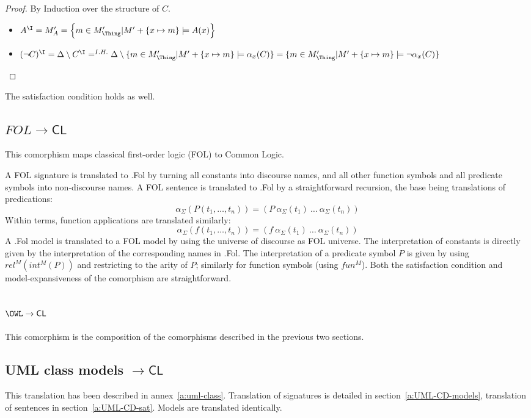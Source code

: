 \documentclass[10pt,fleqn,final]{scrreprt}
\newcommand*{\CL}{\ensuremath{\mathsf{CL}}\xspace}
\newcommand{\ssclause}[1]{\subsection{#1}}
\newenvironment{definitions}[0]{\medskip }{}
\providecommand{\DIFaddbegin}{} %
\providecommand{\DIFaddend}{} %
\providecommand{\DIFdelbegin}{} %
\providecommand{\DIFdelend}{} %
\begin{document}
\begin{definitions}
	\begin{proof} By Induction over the structure of $C$.
\begin{itemize}
	\item $A^\I = M'_A = \left \{m \in M'_{\Thing} \vert M' + \{x \mapsto m \} \models A(x)  \right\}$
	\item $(\lnot C)^\I = \Delta \setminus C^\I =^{I.H.} \Delta \setminus \{m \in M'_\Thing \lvert M' + \{x \mapsto m\} \models \alpha_x(C)\} = \{m \in M'_\Thing \vert M' + \{x \mapsto m\} \models \lnot \alpha_x(C)\}$
\end{itemize}
	\end{proof}

	The satisfaction condition holds as well.

\ssclause{$FOL \rightarrow \CL$}

This comorphism  maps classical first-order logic (FOL) to Common Logic.


A FOL signature is translated to \Clogic.Fol by turning all constants
into discourse names, and all other function symbols and all predicate
symbols into non-discourse names. A FOL sentence is translated
to \Clogic.Fol by a straightforward recursion, the base being translations
of predications:
$$\alpha_\Sigma(P(t_1,\ldots,t_n)) = (P\ \alpha_\Sigma(t_1)\ \ldots\ \alpha_\Sigma(t_n))$$
Within terms, function applications are translated similarly:
$$\alpha_\Sigma(f(t_1,\ldots,t_n)) = (f\ \alpha_\Sigma(t_1)\ \ldots\ \alpha_\Sigma(t_n))$$
A \Clogic.Fol model is translated to a FOL model by using the universe of
discourse as FOL universe. The interpretation of constants is
directly given by the interpretation of the corresponding names
in \Clogic.Fol. The interpretation of a predicate symbol $P$ is given
by using $rel^M(int^M(P))$ and restricting to the arity of $P$;
similarly for function symbols (using $fun^M$). Both the satisfaction condition
and model-expansiveness of the comorphism are straightforward.

\ssclause{$\OWL \rightarrow \CL$}

This comorphism is the composition of the comorphisms described in the previous
two sections.

\DIFdelbegin %
\DIFdelend \DIFaddbegin \ssclause{UML class models $\to \CL$}
\DIFaddend This translation has been described in annex~\ref{a:uml-class}. 
Translation of signatures is detailed in section~\ref{a:UML-CD-models},
translation of sentences in section~\ref{a:UML-CD-sat}.
Models are translated identically.


\end{definitions}
\end{document}
